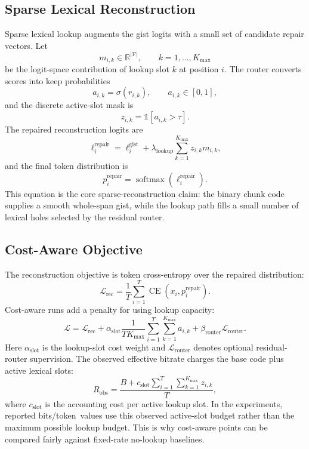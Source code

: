 \documentclass[11pt]{article}
\newcommand{\bitsper}{bits/token}
\newcommand{\Vocab}{\mathcal{V}}
\newcommand{\indicator}{\mathbb{1}}
\newcommand{\softmax}{\operatorname{softmax}}
\newcommand{\CE}{\operatorname{CE}}
\begin{document}
\subsection{Sparse Lexical Reconstruction}
Sparse lexical lookup augments the gist logits with a small set of candidate repair vectors. Let
\begin{equation}
  m_{i,k} \in \mathbb{R}^{|\Vocab|}, \qquad k = 1, \ldots, K_{\max}
\end{equation}
be the logit-space contribution of lookup slot $k$ at position $i$. The router converts scores into keep probabilities
\begin{equation}
  a_{i,k} = \sigma(r_{i,k}), \qquad a_{i,k} \in [0,1],
\end{equation}
and the discrete active-slot mask is
\begin{equation}
  z_{i,k} = \indicator[a_{i,k} > \tau].
\end{equation}
The repaired reconstruction logits are
\begin{equation}
  \ell_i^{\mathrm{repair}}
  = \ell_i^{\mathrm{gist}} + \lambda_{\mathrm{lookup}} \sum_{k=1}^{K_{\max}} z_{i,k} m_{i,k},
\end{equation}
and the final token distribution is
\begin{equation}
  p_i^{\mathrm{repair}} = \softmax(\ell_i^{\mathrm{repair}}).
\end{equation}
This equation is the core sparse-reconstruction claim: the binary chunk code supplies a smooth whole-span gist, while the lookup path fills a small number of lexical holes selected by the residual router.

\subsection{Cost-Aware Objective}
The reconstruction objective is token cross-entropy over the repaired distribution:
\begin{equation}
  \mathcal{L}_{\mathrm{rec}}
  = \frac{1}{T} \sum_{i=1}^{T} \CE(x_i, p_i^{\mathrm{repair}}).
\end{equation}
Cost-aware runs add a penalty for using lookup capacity:
\begin{equation}
  \mathcal{L}
  = \mathcal{L}_{\mathrm{rec}}
  + \alpha_{\mathrm{slot}} \frac{1}{T K_{\max}} \sum_{i=1}^{T} \sum_{k=1}^{K_{\max}} a_{i,k}
  + \beta_{\mathrm{router}} \mathcal{L}_{\mathrm{router}}.
\end{equation}
Here $\alpha_{\mathrm{slot}}$ is the lookup-slot cost weight and $\mathcal{L}_{\mathrm{router}}$ denotes optional residual-router supervision. The observed effective bitrate charges the base code plus active lexical slots:
\begin{equation}
  R_{\mathrm{obs}}
  = \frac{B + c_{\mathrm{slot}} \sum_{i=1}^{T} \sum_{k=1}^{K_{\max}} z_{i,k}}{T},
  \label{eq:observed-rate}
\end{equation}
where $c_{\mathrm{slot}}$ is the accounting cost per active lookup slot. In the experiments, reported \bitsper\ values use this observed active-slot budget rather than the maximum possible lookup budget. This is why cost-aware points can be compared fairly against fixed-rate no-lookup baselines.
\end{document}
